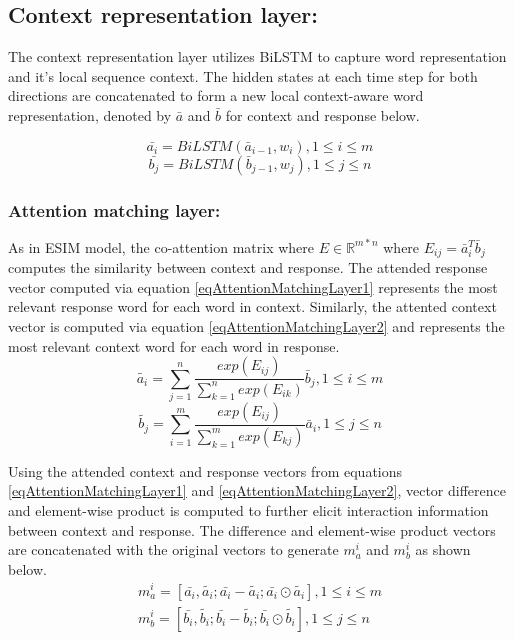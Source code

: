 \documentclass[letterpaper]{article} %
\begin{document}
\subsection{Context representation layer:}
The context representation layer utilizes BiLSTM to capture word representation and it's local sequence context. The hidden states at each time step for both directions are concatenated to form a new local context-aware word representation, denoted by $\bar{a}$ and $\bar{b}$ for context and response
below.

\begin{equation}
\label{eqContextRepresentationLayer1}
\bar{a_i} = BiLSTM(\bar{a}_{i-1}, w_i), 1 \leq i \leq m
\end{equation}
\begin{equation}
\label{eqContextRepresentationLayer2}
\bar{b_j} = BiLSTM(\bar{b}_{j-1}, w_j), 1 \leq j \leq n
\end{equation}

\subsubsection{Attention matching layer:}
As in ESIM model, the co-attention matrix where $E \in \mathbb{R}^{m*n}$ where $E_{ij} =\bar{a}_i^T\bar{b}_j$ computes the similarity between context and response. The attended response vector computed via equation \ref{eqAttentionMatchingLayer1} represents the most relevant response word for each word in context. Similarly, the attented context vector is computed via equation \ref{eqAttentionMatchingLayer2} and represents the most relevant context word for each word in response.
\begin{equation}
\label{eqAttentionMatchingLayer1}
\tilde{a_i} = \sum_{j=1}^n \frac{exp(E_{ij})}{\sum_{k=1}^n exp(E_{ik})}\bar{b}_j, 1 \leq i \leq m
\end{equation}
\begin{equation}
\label{eqAttentionMatchingLayer2}
\tilde{b_j} = \sum_{i=1}^m \frac{exp(E_{ij})}{\sum_{k=1}^m exp(E_{kj})}\bar{a}_i, 1 \leq j \leq n
\end{equation}

Using the attended context and response vectors from equations \ref{eqAttentionMatchingLayer1} and \ref{eqAttentionMatchingLayer2}, vector difference and element-wise product is computed
to further elicit interaction information between context and response. The difference and element-wise product vectors are concatenated with the original vectors to generate $m_a^i$ and $m_b^i$ as shown below. %
\begin{gather}
\label{eq:5}
m_a^i = [\bar{a_i},\tilde{a_i};\bar{a_i}-\tilde{a_i}; \bar{a_i}\odot\tilde{a_i}], 1 \leq i \leq m \\
\label{eq:6}
m_b^i = [\bar{b_i},\tilde{b_i};\bar{b_i}-\tilde{b_i}; \bar{b_i}\odot\tilde{b_i}], 1 \leq j \leq n
\end{gather}
\end{document}
